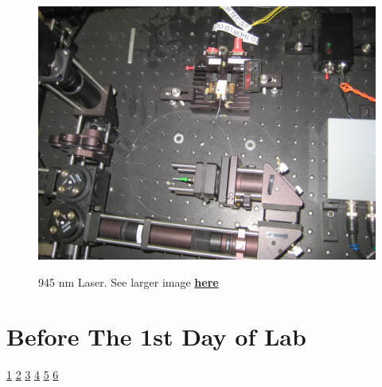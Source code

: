 \documentclass{../lab}
\begin{document}
\begin{figure}[h]
\begin{minipage}{0.38\textwidth}
\end{minipage}
\begin{minipage}{0.3\textwidth}
    \href{http://experimentationlab.berkeley.edu/sites/default/files/images/OTZ_Laser_3550.jpg}{\includegraphics[width=\linewidth,keepaspectratio]{images/OTZ_Laser_3550.jpg}}
    \caption{945 nm Laser. See larger image \href{http://experimentationlab.berkeley.edu/sites/default/files/images/OTZ_Laser_3550.jpg}{\textbf{here}}}
\end{minipage}
\end{figure}

\newpage

\section{Before The 1st Day of Lab}

\signatures \hyperlink{Trapping a Single Bead}{ 1} \hyperlink{Sensitivity vs Laser Power Plot}{ 2} \hyperlink{Sensitivities From Alpha Values}{ 3} \hyperlink{Stiffness Values}{ 4} \hyperlink{Focus Questions}{ 5} \hyperlink{Two Sets of Questions}{ 6}
\end{document}
